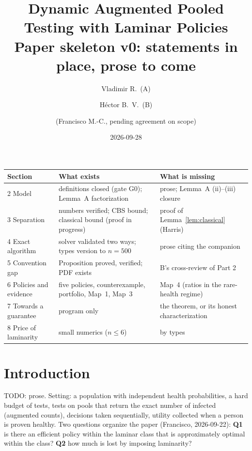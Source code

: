 \documentclass[11pt]{article}
\title{Dynamic Augmented Pooled Testing with Laminar Policies\\ \large Paper skeleton v0: statements in place, prose to come}
\author{Vladimir R.\ (A) \and H\'ector B.\ V.\ (B) \and (Francisco M.-C., pending agreement on scope)}
\date{2026-09-28}
\theoremstyle{remark}
\newcommand{\todo}[1]{\textcolor{red!70!black}{\textsf{\small TODO: #1}}}
\begin{document}
\maketitle

\begin{center}\small
\begin{tabular}{lll}
\toprule
Section & What exists & What is missing \\
\midrule
2 Model & definitions closed (gate G0); Lemma~A factorization & prose; Lemma~A (ii)--(iii) closure \\
3 Separation & numbers verified; CBS bound; classical bound (proof in progress) & proof of Lemma~\ref{lem:classical} (Harris) \\
4 Exact algorithm & solver validated two ways; types version to $n=500$ & prose citing the companion \\
5 Convention gap & Proposition proved, verified; PDF exists & B's cross-review of Part 2 \\
6 Policies and evidence & five policies, counterexample, portfolio, Map~1, Map~3 & Map~4 (ratios in the rare-health regime) \\
7 Towards a guarantee & program only & the theorem, or its honest characterization \\
8 Price of laminarity & small numerics ($n\le6$) & by types \\
\bottomrule
\end{tabular}
\end{center}

\section{Introduction}
\todo{prose.} Setting: a population with independent health probabilities, a hard budget of tests, tests on pools that return the exact number of infected (augmented counts), decisions taken sequentially, utility collected when a person is proven healthy. Two questions organize the paper (Francisco, 2026-09-22): \textbf{Q1} is there an efficient policy within the laminar class that is approximately optimal within the class? \textbf{Q2} how much is lost by imposing laminarity?
\end{document}
